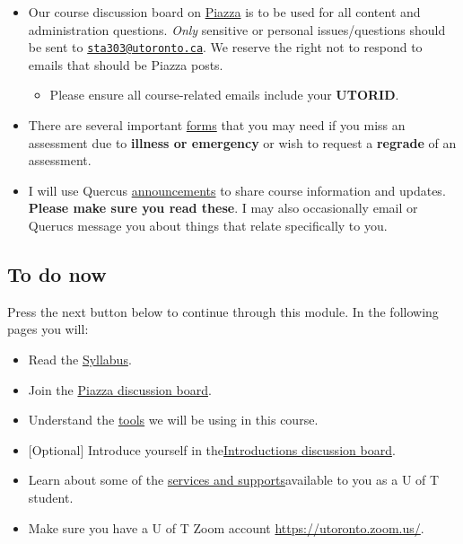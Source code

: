 \documentclass[
  openany]{book}
\providecommand{\tightlist}{%
  \setlength{\itemsep}{0pt}\setlength{\parskip}{0pt}}
\begin{document}
\begin{itemize}
\item
  Our course discussion board on \href{https://piazza.com/class/kx47tj4fmy65dg}{Piazza} is to be used for all content and administration questions. \emph{Only} sensitive or personal issues/questions should be sent to \href{mailto:sta303@utoronto.ca}{\nolinkurl{sta303@utoronto.ca}}. We reserve the right not to respond to emails that should be Piazza posts.

  \begin{itemize}
  \tightlist
  \item
    Please ensure all course-related emails include your \textbf{UTORID}.~
  \end{itemize}
\item
  There are several important \protect\hyperlink{forms}{forms} that you may need if you miss an assessment due to \textbf{illness or emergency} or wish to request a \textbf{regrade} of an assessment.
\item
  I will use Quercus \href{https://q.utoronto.ca/courses/253305/announcements}{announcements} to share course information and updates. \textbf{Please make sure you read these}. I may also occasionally email or Querucs message you about things that relate specifically to you.
\end{itemize}

\hypertarget{to-do-now}{%
\subsection{To do now}\label{to-do-now}}

Press the next button below to continue through this module. In the following pages you will:

\begin{itemize}
\item
  Read the \href{https://q.utoronto.ca/courses/204826/assignments/syllabus}{Syllabus}.~
\item
  Join the \href{http://piazza.com/utoronto.ca/winter2021/sta303h11002hs}{Piazza discussion board}.
\item
  Understand the \href{https://q.utoronto.ca/courses/204826/pages/course-tools}{tools} we will be using in this course.
\item
  {[}Optional{]} Introduce yourself in the\href{https://q.utoronto.ca/courses/204826/discussion_topics/763676}{Introductions discussion board}.
\item
  Learn about some of the \href{https://q.utoronto.ca/courses/204826/pages/services-and-support}{services and supports}available to you as a U of T student.
\item
  Make sure you have a U of T Zoom account \url{https://utoronto.zoom.us/}.~
\end{itemize}
\end{document}
